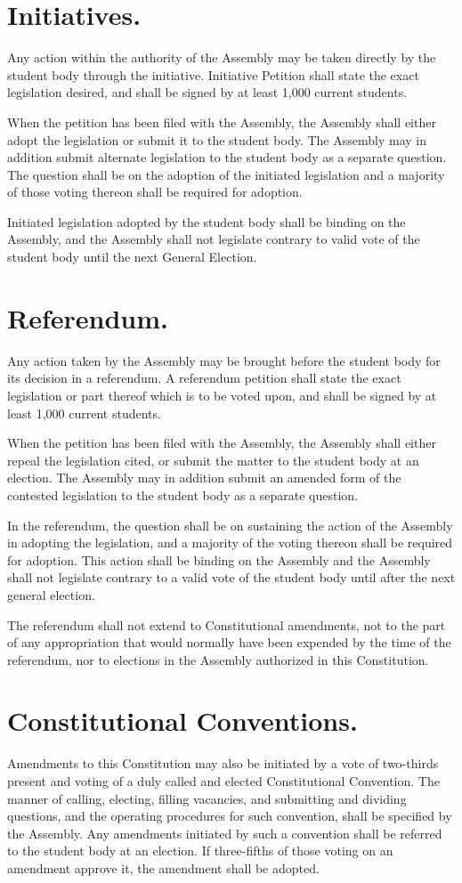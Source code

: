 \section{Initiatives.}
   Any action within the authority of the Assembly may be taken directly by the student body through the initiative. Initiative Petition shall state the exact legislation desired, and shall be signed by at least 1,000 current students.
   
   When the petition has been filed with the Assembly, the Assembly shall either adopt the legislation or submit it to the student body. The Assembly may in addition submit alternate legislation to the student body as a separate question. The question shall be on the adoption of the initiated legislation and a majority of those voting thereon shall be required for adoption.

   Initiated legislation adopted by the student body shall be binding on the Assembly, and the Assembly shall not legislate contrary to valid vote of the student body until the next General Election.

\section{Referendum.}
   Any action taken by the Assembly may be brought before the student body for its decision in a referendum. A referendum petition shall state the exact legislation or part thereof which is to be voted upon, and shall be signed by at least 1,000 current students.

   When the petition has been filed with the Assembly, the Assembly shall either repeal the legislation cited, or submit the matter to the student body at an election. The Assembly may in addition submit an amended form of the contested legislation to the student body as a separate question.

   In the referendum, the question shall be on sustaining the action of the Assembly in adopting the legislation, and a majority of the voting thereon shall be required for adoption. This action shall be binding on the Assembly and the Assembly shall not legislate contrary to a valid vote of the student body until after the next general election.

   The referendum shall not extend to Constitutional amendments, not to the part of any appropriation that would normally have been expended by the time of the referendum, nor to elections in the Assembly authorized in this Constitution.

\section{Constitutional Conventions.}
   Amendments to this Constitution may also be initiated by a vote of two-thirds present and voting of a duly called and elected Constitutional Convention. The manner of calling, electing, filling vacancies, and submitting and dividing questions, and the operating procedures for such convention, shall be specified by the Assembly. Any amendments initiated by such a convention shall be referred to the student body at an election. If three-fifths of those voting on an amendment approve it, the amendment shall be adopted.
